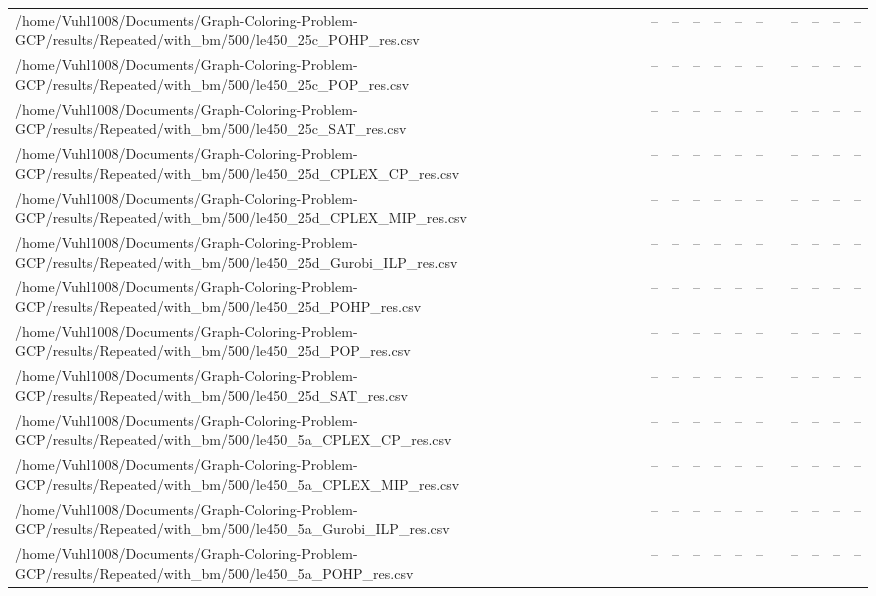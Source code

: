 \begin{table}[htbp]
\begin{tabular}{llllllllllll}
/home/Vuhl1008/Documents/Graph-Coloring-Problem-GCP/results/Repeated/with\_bm/500/le450\_25c\_POHP\_res.csv & -- & -- & -- & -- & -- & -- & {} & -- & -- & -- & -- \\
/home/Vuhl1008/Documents/Graph-Coloring-Problem-GCP/results/Repeated/with\_bm/500/le450\_25c\_POP\_res.csv & -- & -- & -- & -- & -- & -- & {} & -- & -- & -- & -- \\
/home/Vuhl1008/Documents/Graph-Coloring-Problem-GCP/results/Repeated/with\_bm/500/le450\_25c\_SAT\_res.csv & -- & -- & -- & -- & -- & -- & {} & -- & -- & -- & -- \\
/home/Vuhl1008/Documents/Graph-Coloring-Problem-GCP/results/Repeated/with\_bm/500/le450\_25d\_CPLEX\_CP\_res.csv & -- & -- & -- & -- & -- & -- & {} & -- & -- & -- & -- \\
/home/Vuhl1008/Documents/Graph-Coloring-Problem-GCP/results/Repeated/with\_bm/500/le450\_25d\_CPLEX\_MIP\_res.csv & -- & -- & -- & -- & -- & -- & {} & -- & -- & -- & -- \\
/home/Vuhl1008/Documents/Graph-Coloring-Problem-GCP/results/Repeated/with\_bm/500/le450\_25d\_Gurobi\_ILP\_res.csv & -- & -- & -- & -- & -- & -- & {} & -- & -- & -- & -- \\
/home/Vuhl1008/Documents/Graph-Coloring-Problem-GCP/results/Repeated/with\_bm/500/le450\_25d\_POHP\_res.csv & -- & -- & -- & -- & -- & -- & {} & -- & -- & -- & -- \\
/home/Vuhl1008/Documents/Graph-Coloring-Problem-GCP/results/Repeated/with\_bm/500/le450\_25d\_POP\_res.csv & -- & -- & -- & -- & -- & -- & {} & -- & -- & -- & -- \\
/home/Vuhl1008/Documents/Graph-Coloring-Problem-GCP/results/Repeated/with\_bm/500/le450\_25d\_SAT\_res.csv & -- & -- & -- & -- & -- & -- & {} & -- & -- & -- & -- \\
/home/Vuhl1008/Documents/Graph-Coloring-Problem-GCP/results/Repeated/with\_bm/500/le450\_5a\_CPLEX\_CP\_res.csv & -- & -- & -- & -- & -- & -- & {} & -- & -- & -- & -- \\
/home/Vuhl1008/Documents/Graph-Coloring-Problem-GCP/results/Repeated/with\_bm/500/le450\_5a\_CPLEX\_MIP\_res.csv & -- & -- & -- & -- & -- & -- & {} & -- & -- & -- & -- \\
/home/Vuhl1008/Documents/Graph-Coloring-Problem-GCP/results/Repeated/with\_bm/500/le450\_5a\_Gurobi\_ILP\_res.csv & -- & -- & -- & -- & -- & -- & {} & -- & -- & -- & -- \\
/home/Vuhl1008/Documents/Graph-Coloring-Problem-GCP/results/Repeated/with\_bm/500/le450\_5a\_POHP\_res.csv & -- & -- & -- & -- & -- & -- & {} & -- & -- & -- & -- \\

\end{tabular}
\end{table}
